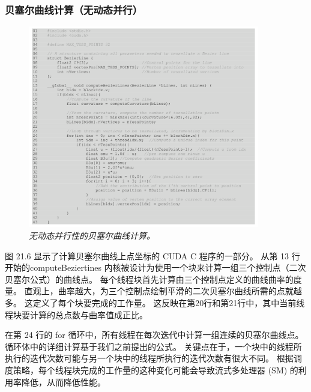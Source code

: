 \subsubsection{贝塞尔曲线计算（无动态并行）}
\begin{figure}[H]
	\centering
	\includegraphics[width=0.9\textwidth]{figs/F21.6.png}
	\caption{\textit{无动态并行性的贝塞尔曲线计算。}}
\end{figure}

图 21.6 显示了计算贝塞尔曲线上点坐标的 CUDA C 程序的一部分。 
从第 13 行开始的computeBeziertines 内核被设计为使用一个块来计算一组三个控制点（二次贝塞尔公式）的曲线点。 
每个线程块首先计算由三个控制点定义的曲线曲率的度量。 直观上，曲率越大，为三个控制点绘制平滑的二次贝塞尔曲线所需的点就越多。 
这定义了每个块要完成的工作量。 这反映在第20行和第21行中，其中当前线程块要计算的总点数与曲率值成正比。

在第 24 行的 for 循环中，所有线程在每次迭代中计算一组连续的贝塞尔曲线点。 循环体中的详细计算基于我们之前提出的公式。 
关键点在于，一个块中的线程所执行的迭代次数可能与另一个块中的线程所执行的迭代次数有很大不同。 
根据调度策略，每个线程块完成的工作量的这种变化可能会导致流式多处理器 (SM) 的利用率降低，从而降低性能。

